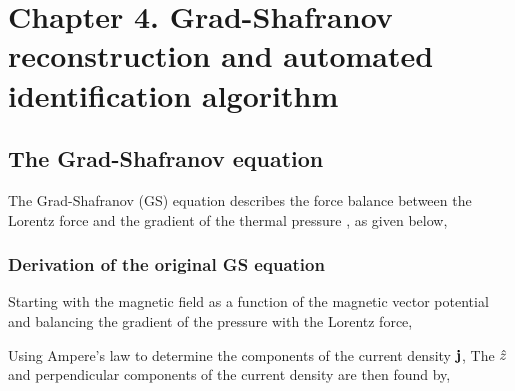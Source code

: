 \chapter{Chapter 4. Grad-Shafranov reconstruction and automated identification algorithm} \label{ch:ch4_GS} %

\section{The Grad-Shafranov equation}
%
The Grad-Shafranov (GS) equation describes the force balance between the Lorentz force and the gradient of the thermal pressure \citep{Sonnerup:1996, Hau:1999}, as given below,

\subsection{Derivation of the original GS equation}
Starting with the magnetic field as a function of the magnetic vector potential and balancing the gradient of the pressure with the Lorentz force,

\noindent Using Ampere's law to determine the components of the current density $\mathbf{j}$,
The $\hat{z}$ and perpendicular components of the current density are then found by,

